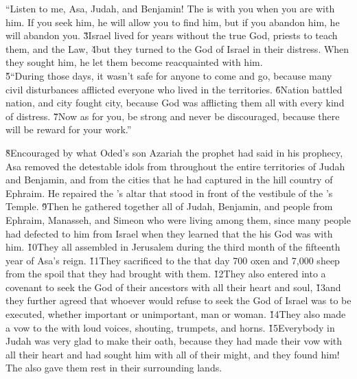\begin{poetry}
\poeml ``Listen to me, Asa, Judah, and Benjamin! The  is with you when you are with him. If you seek him, he will allow you to find him, but if you abandon him, he will abandon you. \v{3}Israel lived for years without the true God, priests to teach them, and the Law, \v{4}but they turned to the  God of Israel in their distress. When they sought him, he let them become reacquainted with him. \\
\poeml \v{5}``During those days, it wasn't safe for anyone to come and go, because many civil disturbances afflicted everyone who lived in the territories. \v{6}Nation battled nation, and city fought city, because God was afflicting them all with every kind of distress. \v{7}Now as for you, be strong and never be discouraged, because there will be reward for your work.''
\end{poetry}

\v{8}Encouraged by what Oded's son Azariah the prophet had said in his prophecy, Asa removed the detestable idols from throughout the entire territories of Judah and Benjamin, and from the cities that he had captured in the hill country of Ephraim. He repaired the 's altar that stood in front of the vestibule of the 's Temple. \v{9}Then he gathered together all of Judah, Benjamin, and people from Ephraim, Manasseh, and Simeon who were living among them, since many people had defected to him from Israel when they learned that the  his God was with him. \v{10}They all assembled in Jerusalem during the third month of the fifteenth year of Asa's reign. \v{11}They sacrificed to the  that day 700 oxen and 7,000 sheep from the spoil that they had brought with them. \v{12}They also entered into a covenant to seek the  God of their ancestors with all their heart and soul, \v{13}and they further agreed that whoever would refuse to seek the  God of Israel was to be executed, whether important or unimportant, man or woman. \v{14}They also made a vow to the  with loud voices, shouting, trumpets, and horns. \v{15}Everybody in Judah was very glad to make their oath, because they had made their vow with all their heart and had sought him with all of their might, and they found him! The  also gave them rest in their surrounding lands.

